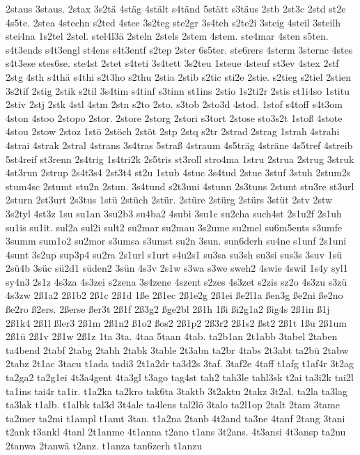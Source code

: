 {2staus
3staus.
2stax
3s2tä
4stäg
4stält
s4tänd
5stätt
s3täus
2stb
2st3c
2std
st2e
4s5te.
2stea
4stechn
s2ted
4stee
3s2teg
ste2gr
3s4teh
s2te2i
3steig
4steil
3steilh
stei4na
1s2tel
2stel.
stel4l3ä
2steln
2stels
2stem
4stem.
ste4mar
4sten
s5ten.
s4t3ends
s4t3engl
st4ens
s4t3entf
s2tep
2ster
6s5ter.
ste6rers
4sterm
3sternc
4stes
s4t3ese
stes6se.
ste4st
2stet
s4teti
3s4tett
3s2teu
1steue
4steuf
st3ev
4stex
2stf
2stg
4sth
s4thä
s4thi
s2t3ho
s2thu
2stia
2stib
s2tic
sti2e
2stie.
s2tieg
s2tiel
2stien
3s2tif
2stig
2stik
s2til
3s4tim
s4tinf
s3tinn
st1ins
2stio
1s2ti2r
2stis
st1i4so
1stitu
2stiv
2stj
2stk
4stl
4stm
2stn
s2to
2sto.
s3tob
2sto3d
4stod.
1stof
s4toff
s4t3om
4ston
4stoo
2stopo
2stor.
2store
2storg
2stori
s3tort
2stose
sto3s2t
1stoß
4stote
4stou
2stow
2stoz
1stö
2stöch
2stöt
2stp
2stq
s2tr
2strad
2strag
1strah
4strahi
4strai
4strak
2stral
4strans
3s4tras
5straß
4straum
4s5träg
4sträne
4s5tref
4streib
5st4reif
st3renn
2s4trig
1s4tri2k
2s5tris
st3roll
stro4ma
1stru
2strua
2strug
3struk
4st3run
2strup
2s4t3s4
2st3t4
st2u
1stub
4stuc
3s4tud
2stue
3stuf
3stuh
2stum2s
stum4sc
2stumt
stu2n
2stun.
3s4tund
s2t3uni
4stunn
2s3tuns
2stunt
stu3re
st3url
2sturn
2st3urt
2s3tus
1stü
2stüch
2stür.
2stüre
2stürg
2stürs
3stüt
2stv
2stw
3s2tyl
4st3z
1su
su1an
3su2b3
su4ba2
4subi
3su1c
su2cha
such4st
2s1u2f
2s1uh
su1is
su1it.
sul2a
sul2i
sult2
su2mar
su2mau
3s2ume
su2mel
su6m5ents
s3umfe
3summ
sum1o2
su2mor
s3umsa
s3umst
su2n
3sun.
sun6derh
su4ne
s1unf
2s1uni
4sunt
3s2up
sup3p4
su2ra
2s1url
s1urt
s4u2s1
su3sa
su3sh
su3si
sus3s
3suv
1sü
2sü4b
3süc
sü2d1
süden2
3sün
4s3v
2s1w
s3wa
s3we
sweh2
4swie
4swil
1s4y
syl1
sy4n3
2s1z
4s3za
4s3zei
s2zena
3s4zene
4szent
s2zes
4s3zet
s2zis
sz2o
4s3zu
s3zü
4s3zw
2ß1a2
2ß1b2
2ß1c
2ß1d
1ße
2ß1ec
2ß1e2g
2ß1ei
ße2l1a
ßen3g
ße2ni
ße2no
ße2ro
ß2ers.
2ßerse
ßer3t
2ß1f
2ß3g2
ßge2bl
2ß1h
1ßi
ßi2g1a2
ßig4s
2ß1in
ß1j
2ß1k4
2ß1l
ßler3
2ß1m
2ß1n2
ß1o2
ßos2
2ß1p2
2ß3r2
2ß1s2
ßst2
2ß1t
1ßu
2ß1um
2ß1ü
2ß1v
2ß1w
2ß1z
1ta
3ta.
4taa
5taan
4tab.
ta2b1an
2t1abb
3tabel
2taben
ta4bend
2tabf
2tabg
2tabh
2tabk
3table
2t3abn
ta2br
4tabs
2t3abt
ta2bü
2tabw
2tabz
2t1ac
3tacu
t1ada
tadi3
2t1a2dr
ta3d2s
3taf.
3taf2e
4taff
t1afg
t1af4r
3t2ag
ta2ga2
ta2g1ei
4t3a4gent
4ta3gl
t3ago
tag4st
tah2
tah3le
tahl3sk
t2ai
ta3i2k
tai2l
ta1ins
tai4r
ta1ir.
t1a2ka
ta2kro
tak6ta
3taktb
3t2aktu
2takz
3t2al.
ta2la
ta3lag
ta3lak
t1alb.
t1albk
tal3d
3t4ale
ta4lens
tal2lö
3talo
ta2l1op
2talt
2tam
3tame
ta2mer
ta2mi
t1ampl
t1amt
3tan.
t1a2na
2tanb
4t2and
ta3ne
4tanf
2tang
3tani
t2ank
t3ankl
4tanl
2t1anme
4t1anna
t2ano
t1ans
3t2ans.
4t3ansi
4t3ansp
ta2nu
2tanwa
2tanwä
t2anz.
t1anza
tan6zerh
t1anzu
}
